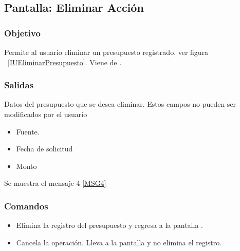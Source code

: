 \subsection{Pantalla: Eliminar Acción}

\subsubsection{Objetivo}
Permite al usuario eliminar un presupuesto registrado, ver figura ~\ref{IUEliminarPresupuesto}. Viene de .


\subsubsection{Salidas}
  Datos del presupuesto  que se desea eliminar. Estos campos no pueden ser modificados por el usuario
\begin{itemize}
 \item Fuente.
 \item Fecha de solicitud
 \item Monto
\end{itemize}

Se muestra el mensaje 4 \ref{MSG4}

\subsubsection{Comandos}
\begin{itemize}
 \item {} Elimina la  registro del presupuesto y regresa a la pantalla .
 \item {} Cancela la operación. Lleva a la pantalla  y no elimina el registro.
\end{itemize}


